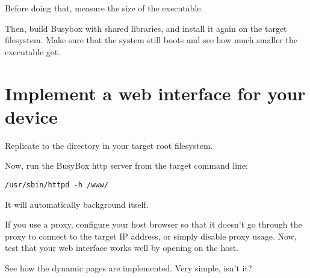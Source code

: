 Before doing that, measure the size of the  executable.

Then, build Busybox with shared libraries, and install it again on the
target filesystem. Make sure that the system still boots and see
how much smaller the  executable got.

\section{Implement a web interface for your device}

Replicate  to the  directory in your target root filesystem.

Now, run the BusyBox http server from the target command line:

\begin{verbatim}
/usr/sbin/httpd -h /www/
\end{verbatim}

It will automatically background itself.

If you use a proxy, configure your host browser so that it doesn't go
through the proxy to connect to the target IP address, or simply
disable proxy usage.  Now, test that your web interface works well by
opening  on the host.

See how the dynamic pages are implemented. Very simple, isn't it?

